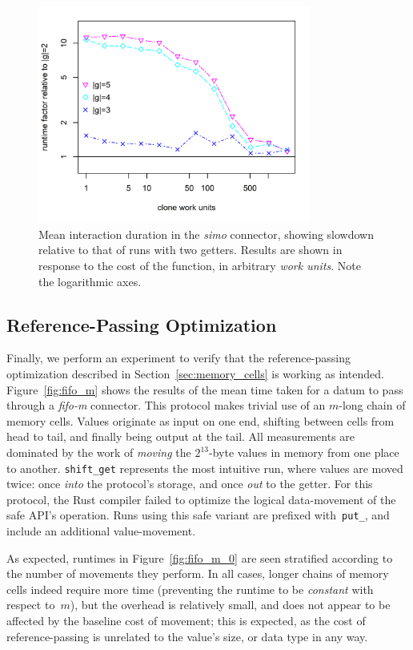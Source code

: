\begin{figure}
	\centering
	\includegraphics[width=0.80\textwidth]{experiments/simo_2.png}
	\caption[Interaction duration in proportion to the 2-getter case.]{Mean interaction duration in the \textit{simo} connector, showing slowdown relative to that of runs with two getters. Results are shown in response to the cost of the  function, in arbitrary \textit{work units}. Note the logarithmic axes.}
	\label{fig:simo_2}
\end{figure}

\subsection{Reference-Passing Optimization}
Finally, we perform an experiment to verify that the reference-passing optimization described in Section~\ref{sec:memory_cells} is working as intended. Figure~\ref{fig:fifo_m} shows the results of the mean time taken for a datum to pass through a \textit{fifo-m} connector. This protocol makes trivial use of an $m$-long chain of memory cells. Values originate as input on one end, shifting between cells from head to tail, and finally being output at the tail. All measurements are dominated by the work of \textit{moving} the $2^{13}$-byte values in memory from one place to another. \texttt{shift\_get} represents the most intuitive run, where values are moved twice: once \textit{into} the protocol's storage, and once \textit{out} to the getter. For this protocol, the Rust compiler failed to optimize the logical data-movement of the safe API's  operation. Runs using this safe variant are prefixed with~\texttt{put\_}, and include an additional value-movement.

As expected, runtimes in Figure~\ref{fig:fifo_m_0} are seen stratified according to the number of movements they perform. In all cases, longer chains of memory cells indeed require more time (preventing the runtime to be \textit{constant} with respect to~$m$), but the overhead is relatively small, and does not appear to be affected by the baseline cost of movement; this is expected, as the cost of reference-passing is unrelated to the value's size, or data type in any way.

